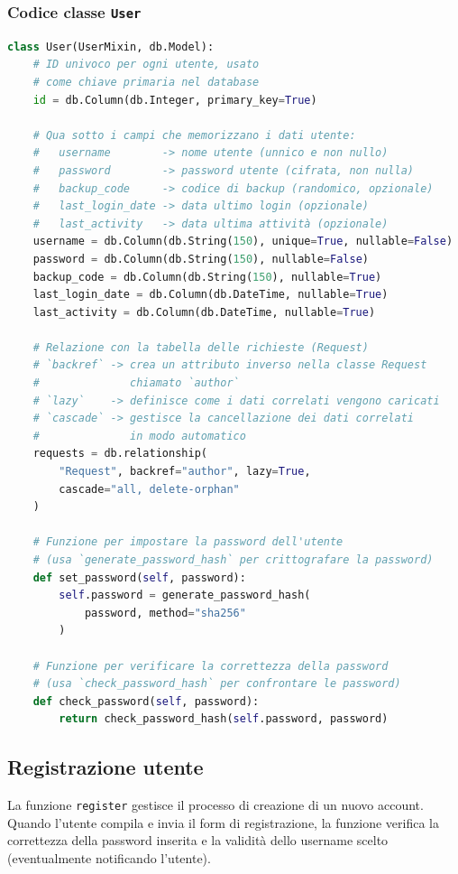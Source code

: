 \documentclass[12pt]{report}
\begin{document}
\subsubsection{Codice classe \texttt{User}}
\begin{lstlisting}[language=Python]
class User(UserMixin, db.Model):
    # ID univoco per ogni utente, usato
    # come chiave primaria nel database
    id = db.Column(db.Integer, primary_key=True)

    # Qua sotto i campi che memorizzano i dati utente:
    #   username        -> nome utente (unnico e non nullo)
    #   password        -> password utente (cifrata, non nulla)
    #   backup_code     -> codice di backup (randomico, opzionale)
    #   last_login_date -> data ultimo login (opzionale)
    #   last_activity   -> data ultima attività (opzionale)
    username = db.Column(db.String(150), unique=True, nullable=False)
    password = db.Column(db.String(150), nullable=False)
    backup_code = db.Column(db.String(150), nullable=True)
    last_login_date = db.Column(db.DateTime, nullable=True)
    last_activity = db.Column(db.DateTime, nullable=True)

    # Relazione con la tabella delle richieste (Request)
    # `backref` -> crea un attributo inverso nella classe Request
    #              chiamato `author`
    # `lazy`    -> definisce come i dati correlati vengono caricati
    # `cascade` -> gestisce la cancellazione dei dati correlati
    #              in modo automatico
    requests = db.relationship(
        "Request", backref="author", lazy=True,
        cascade="all, delete-orphan"
    )

    # Funzione per impostare la password dell'utente
    # (usa `generate_password_hash` per crittografare la password)
    def set_password(self, password):
        self.password = generate_password_hash(
            password, method="sha256"
        )

    # Funzione per verificare la correttezza della password
    # (usa `check_password_hash` per confrontare le password)
    def check_password(self, password):
        return check_password_hash(self.password, password)
\end{lstlisting}


\subsection{Registrazione utente}
La funzione \texttt{register} gestisce il processo di creazione di un nuovo account. Quando l'utente compila e invia il form di registrazione, la funzione verifica la correttezza della password inserita e la validità dello username scelto (eventualmente notificando l'utente).
\end{document}
